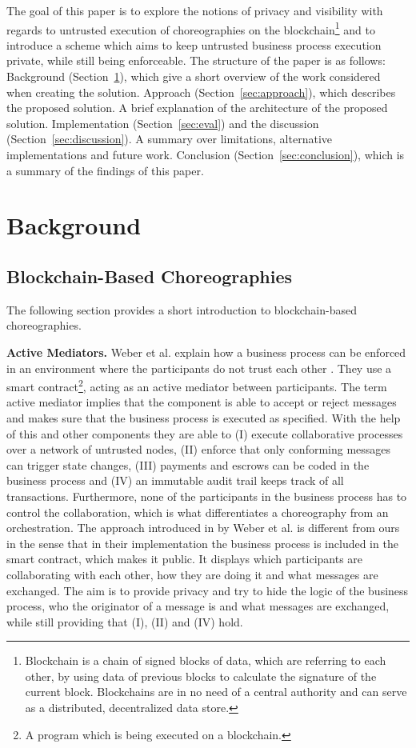 \documentclass[runningheads]{llncs}
\newcommand{\refsec}[1]{Section~\ref{#1}}
\begin{document}
The goal of this paper is to explore the notions of privacy and visibility with regards to untrusted execution of choreographies on the blockchain\footnote{Blockchain is a chain of signed blocks of data, which are referring to each other, by using data of previous blocks to calculate the signature of the current block. Blockchains are in no need of a central authority and can serve as a distributed, decentralized data store. } and to introduce a scheme which aims to keep untrusted business process execution private, while still being enforceable. The structure of the paper is as follows: Background (\refsec{sec:background}), which give a short overview of the work considered when creating the solution. Approach (\refsec{sec:approach}), which describes the proposed solution. A brief explanation of the architecture of the proposed solution. Implementation (\refsec{sec:eval}) and the discussion (\refsec{sec:discussion}). A summary over limitations, alternative implementations and future work. Conclusion (\refsec{sec:conclusion}), which is a summary of the findings of this paper.

\section{Background} \label{sec:background}

\subsection{Blockchain-Based Choreographies} \label{subsec:blockchainbased}

The following section provides a short introduction to blockchain-based choreographies. 

\textbf{Active Mediators.} Weber et al. explain how a business process can be enforced in an environment where the participants do not trust each other \cite{weber2016untrusted}. They use a smart contract\footnote{A program which is being executed on a blockchain.}, acting as an active mediator between participants. The term active mediator implies that the component is able to accept or reject messages and makes sure that the business process is executed as specified. With the help of this and other components they are able to (I) execute collaborative processes over a network of untrusted nodes, (II) enforce that only conforming messages can trigger state changes, (III) payments and escrows can be coded in the business process and (IV) an immutable audit trail keeps track of all transactions. Furthermore, none of the participants in the business process has to control the collaboration, which is what differentiates a choreography from an orchestration. The approach introduced in by Weber et al. is different from ours in the sense that in their implementation the business process is included in the smart contract, which makes it public. It displays which participants are collaborating with each other, how they are doing it and what messages are exchanged. The aim is to provide privacy and try to hide the logic of the business process, who the originator of a message is  and what messages are exchanged, while still providing that (I), (II) and (IV) hold.
\end{document}
